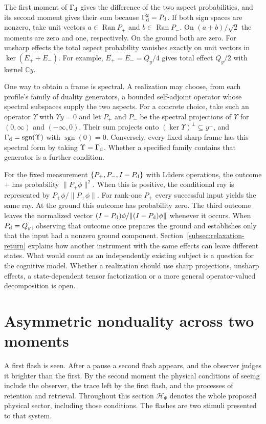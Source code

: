 \documentclass[11pt]{article}
\theoremstyle{definition}
\DeclareMathOperator{\Ran}{Ran}
\newcommand{\C}{\mathbb C}
\begin{document}
The first moment of $\Gamma_{\rm d}$ gives the difference of the two aspect probabilities, and its second moment gives their sum because $\Gamma_{\rm d}^2=P_{\rm d}$. If both sign spaces are nonzero, take unit vectors $a\in\Ran P_+$ and $b\in\Ran P_-$. On $(a+b)/\sqrt2$ the moments are zero and one, respectively. On the ground both are zero. For unsharp effects the total aspect probability vanishes exactly on unit vectors in $\ker(E_++E_-)$. For example, $E_+=E_-=Q_y/4$ gives total effect $Q_y/2$ with kernel $\C y$.

One way to obtain a frame is spectral. A realization may choose, from each profile's family of duality generators, a bounded self-adjoint operator whose spectral subspaces supply the two aspects. For a concrete choice, take such an operator $\Upsilon$ with $\Upsilon y=0$ and let $P_+$ and $P_-$ be the spectral projections of $\Upsilon$ for $(0,\infty)$ and $(-\infty,0)$. Their sum projects onto $(\ker\Upsilon)^\perp\subseteq y^\perp$, and $\Gamma_{\rm d}=\operatorname{sgn}(\Upsilon)$ with $\operatorname{sgn}(0)=0$. Conversely, every fixed sharp frame has this spectral form by taking $\Upsilon=\Gamma_{\rm d}$. Whether a specified family contains that generator is a further condition.

For the fixed measurement $\{P_+,P_-,I-P_{\rm d}\}$ with L\"uders operations, the outcome $+$ has probability $\|P_+\phi\|^2$. When this is positive, the conditional ray is represented by $P_+\phi/\|P_+\phi\|$. For rank-one $P_+$ every successful input yields the same ray. At the ground this outcome has probability zero. The third outcome leaves the normalized vector $(I-P_{\rm d})\phi/\|(I-P_{\rm d})\phi\|$ whenever it occurs. When $P_{\rm d}=Q_y$, observing that outcome once prepares the ground and establishes only that the input had a nonzero ground component. Section~\ref{subsec:relaxation-return} explains how another instrument with the same effects can leave different states. What would count as an independently existing subject is a question for the cognitive model. Whether a realization should use sharp projections, unsharp effects, a state-dependent tensor factorization or a more general operator-valued decomposition is open.

\section{Asymmetric nonduality across two moments}
\label{sec:asymmetric-nonduality-moments}

A first flash is seen. After a pause a second flash appears, and the observer judges it brighter than the first. By the second moment the physical conditions of seeing include the observer, the trace left by the first flash, and the processes of retention and retrieval. Throughout this section $\mathcal H_\Psi$ denotes the whole proposed physical sector, including those conditions. The flashes are two stimuli presented to that system.
\end{document}
